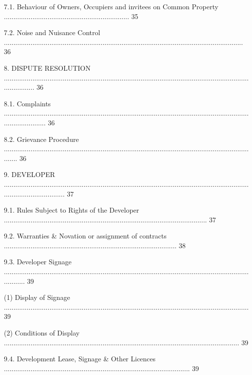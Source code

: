 \documentclass{article}
\begin{document}
{\fontsize{9.99}{1}7.1. Behaviour of Owners, Occupiers and invitees on Common Property .................................................................. 35 }

{\fontsize{9.99}{1}7.2. Noise and Nuisance Control .............................................................................................................................. 36 }

{\fontsize{9.99}{1}8. DISPUTE RESOLUTION ................................................................................................................................................. 36 }

{\fontsize{9.99}{1}8.1. Complaints ....................................................................................................................................................... 36 }

{\fontsize{9.99}{1}8.2. Grievance Procedure ........................................................................................................................................ 36 }

{\fontsize{9.99}{1}9. DEVELOPER ................................................................................................................................................................. 37 }

{\fontsize{9.99}{1}9.1. Rules Subject to Rights of the Developer ........................................................................................................... 37 }

{\fontsize{9.99}{1}9.2. Warranties \& Novation or assignment of contracts ........................................................................................... 38 }

{\fontsize{9.99}{1}9.3. Developer Signage ............................................................................................................................................ 39 }

{\fontsize{9.962}{1}(1) Display of Signage ................................................................................................................................. 39 }

{\fontsize{9.962}{1}(2) Conditions of Display ............................................................................................................................ 39 }

{\fontsize{9.99}{1}9.4. Development Lease, Signage \& Other Licences .................................................................................................. 39 }
\end{document}
